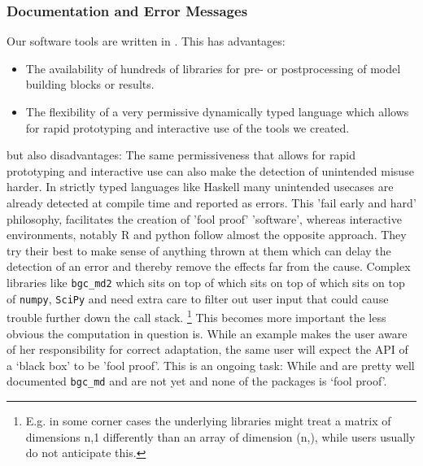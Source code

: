 \subsubsection{Documentation and Error Messages}
Our software tools are written in \python{}. 
This has advantages:
\begin{itemize}
  \item
  The availability of hundreds of libraries for pre-  or postprocessing of model building blocks or results.
  \item
  The flexibility of a very permissive dynamically typed language which allows for rapid prototyping and interactive use of the tools we created.
\end{itemize}
but also disadvantages: The same permissiveness that allows for rapid prototyping and interactive use can also make the detection of unintended misuse harder.
In strictly typed languages like Haskell many unintended usecases are already detected at compile time and reported as errors.
This 'fail early and hard' philosophy, facilitates the creation of 'fool proof'
'software', whereas interactive environments, notably  R and python follow
almost the opposite approach.  They try their best to make sense of anything
thrown at them which can delay the detection of an error and thereby remove the effects far from the cause.
Complex libraries like \texttt{bgc\_md2} which sits on top of \CompartmentalSystems{} which sits on top of \LAPM{} which sits on top of \texttt{numpy}, \texttt{SciPy} and \sympy{}
need extra care to filter out user input that could cause trouble further down the call stack. 
\footnote{E.g. in some corner cases the underlying libraries might treat a matrix of dimensions n,1 differently than an array of dimension (n,), while users usually do not anticipate this.} This becomes more important the less obvious the computation in question is. 
While an example makes the user aware of her responsibility for correct adaptation, the same user will expect the API of a `black box' to be 'fool proof'. 
This is an ongoing task: While \LAPM{} and \CompartmentalSystems{} are pretty well documented 
\texttt{bgc\_md} and \ComputabilityGraphs{} are not yet and none of the packages is `fool proof'. 




